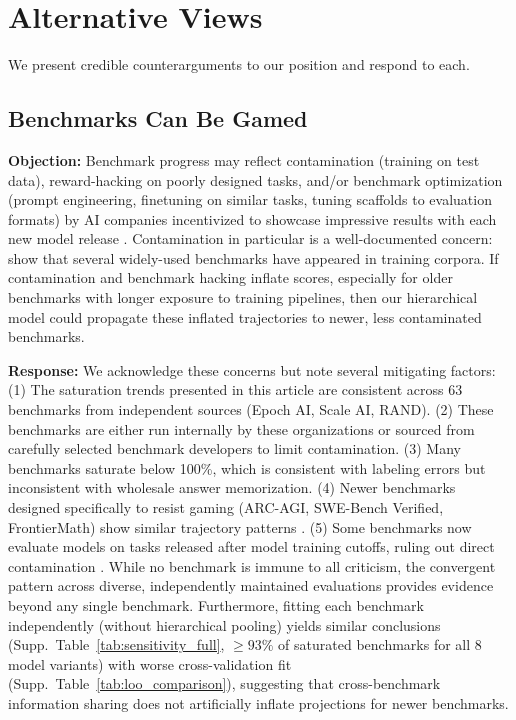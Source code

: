 \documentclass[letterpaper,twocolumn]{article}
\newcommand{\revised}[1]{#1}
\begin{document}
\section{Alternative Views}
\label{sec:alternatives}

We present credible counterarguments to our position and respond to each.

\subsection{Benchmarks Can Be Gamed}
\label{subsec:alt_contamination}

\textbf{Objection:} Benchmark progress may reflect contamination (training on test data), reward-hacking on poorly designed tasks, and/or benchmark optimization \revised{(prompt engineering, finetuning on similar tasks, tuning scaffolds to evaluation formats)} by AI companies incentivized to showcase impressive results with each new model release \citep{robison_meta_2025}. \revised{Contamination in particular is a well-documented concern: \citet{balloccu_leak_2024} show that several widely-used benchmarks have appeared in training corpora. If contamination and benchmark hacking inflate scores, especially for older benchmarks with longer exposure to training pipelines, then our hierarchical model could propagate these inflated trajectories to newer, less contaminated benchmarks.}

\textbf{Response:} We acknowledge these concerns but note several mitigating factors: (1) The saturation trends presented in this article are consistent across \revised{63} benchmarks from independent sources (Epoch AI, Scale AI, RAND). (2) These benchmarks are either run internally by these organizations or sourced from carefully selected benchmark developers \citep{epoch_ai_ai_2024} to limit contamination. (3) Many benchmarks saturate below 100\%, which is consistent with labeling errors but inconsistent with wholesale answer memorization. (4) Newer benchmarks designed specifically to resist gaming (ARC-AGI, SWE-Bench Verified, FrontierMath) show similar trajectory patterns \citep{chollet_measure_2019,epoch_ai_swe-bench_2024,epoch_ai_frontiermath_2025}. (5) Some benchmarks now evaluate models on tasks released after model training cutoffs, ruling out direct contamination \citep{white_livebench_2025}. While no benchmark is immune to all criticism, the convergent pattern across diverse, independently maintained evaluations provides evidence beyond any single benchmark. \revised{Furthermore, fitting each benchmark independently (without hierarchical pooling) yields similar conclusions (Supp.\ Table~\ref{tab:sensitivity_full}, $\geq 93\%$ of saturated benchmarks for all 8 model variants) with worse cross-validation fit  (Supp.\ Table~\ref{tab:loo_comparison}), suggesting that cross-benchmark information sharing does not artificially inflate projections for newer benchmarks.}
\end{document}
